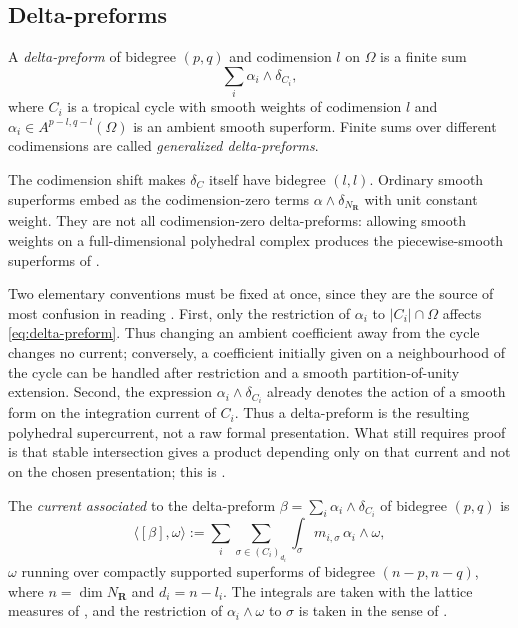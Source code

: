 \subsection{Delta-preforms}
\label{sec:ch18-delta-preforms}

\begin{definition}
\label{def:ch18-delta-preform}
A \emph{delta-preform} of bidegree $(p,q)$ and codimension $l$ on
$\Omega$ is a finite sum
\begin{equation}
                       \sum_i \alpha_i\wedge\delta_{C_i},
\label{eq:delta-preform}
\end{equation}
where $C_i$ is a tropical cycle with smooth weights of codimension $l$ and
$\alpha_i\in A^{p-l,q-l}(\Omega)$ is an ambient smooth superform.
Finite sums over different codimensions are called
\emph{generalized delta-preforms}.
\end{definition}

The codimension shift makes $\delta_C$ itself have bidegree $(l,l)$.
Ordinary smooth superforms embed as the codimension-zero terms
$\alpha\wedge\delta_{N_{\mathbf R}}$ with unit constant weight.  They are
not all codimension-zero delta-preforms: allowing smooth weights on a
full-dimensional polyhedral complex produces the piecewise-smooth
superforms of \cite[Example~2.10]{GK17}.

Two elementary conventions must be fixed at once, since they are the source
of most confusion in reading \cite{GK17}.  First, only the restriction of
$\alpha_i$ to $|C_i|\cap\Omega$ affects
\eqref{eq:delta-preform}.  Thus changing an ambient coefficient away from
the cycle changes no current; conversely, a coefficient initially given on
a neighbourhood of the cycle can be handled after restriction and a smooth
partition-of-unity extension.  Second, the expression
$\alpha_i\wedge\delta_{C_i}$ already denotes the action of a smooth form on
the integration current of $C_i$.  Thus a delta-preform is the resulting
polyhedral supercurrent, not a raw formal presentation.  What still requires
proof is that stable intersection gives a product depending only on that
current and not on the chosen presentation; this is
.

\begin{definition}
\label{def:ch18-associated-current}
The \emph{current associated} to the delta-preform
$\beta=\sum_i\alpha_i\wedge\delta_{C_i}$ of bidegree $(p,q)$ is
\begin{equation}
\label{eq:ch18-associated-current}
 \langle[\beta],\omega\rangle
 :=\sum_i\sum_{\sigma\in(C_i)_{d_i}}
    \int_\sigma m_{i,\sigma}\,\alpha_i\wedge\omega ,
\end{equation}
$\omega$ running over compactly supported superforms of bidegree
$(n-p,n-q)$, where $n=\dim N_{\mathbf R}$ and $d_i=n-l_i$.  The integrals
are taken with the lattice measures of , and
the restriction of $\alpha_i\wedge\omega$ to $\sigma$ is taken in the sense
of .
\end{definition}

